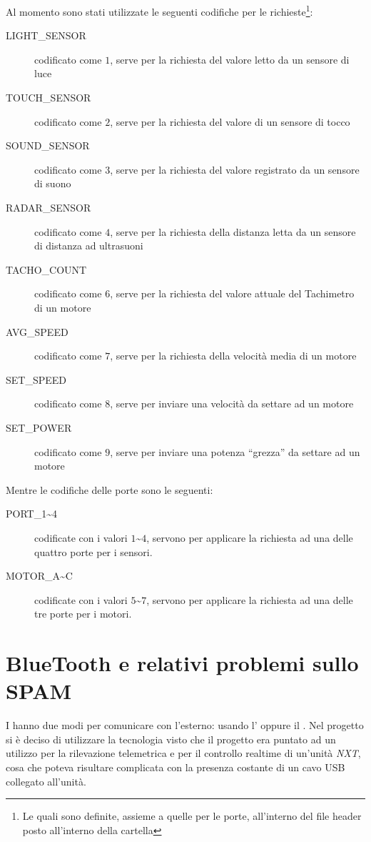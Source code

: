 Al momento sono stati utilizzate le seguenti codifiche per le
richieste\footnote{Le quali sono definite, assieme a quelle per le porte,
all'interno del file header  posto all'interno della
cartella }:
\begin{description}
    \item[LIGHT\_SENSOR] codificato come $1$, serve per la richiesta del
        valore letto da un sensore di luce
    \item[TOUCH\_SENSOR] codificato come $2$, serve per la richiesta del
        valore di un sensore di tocco
    \item[SOUND\_SENSOR] codificato come $3$, serve per la richiesta del
        valore registrato da un sensore di suono
    \item[RADAR\_SENSOR] codificato come $4$, serve per la richiesta della
        distanza letta da un sensore di distanza ad ultrasuoni
    \item[TACHO\_COUNT] codificato come $6$, serve per la richiesta del
        valore attuale del Tachimetro di un motore
    \item[AVG\_SPEED] codificato come $7$, serve per la richiesta della
        velocità media di un motore
    \item[SET\_SPEED] codificato come $8$, serve per inviare una velocità da
        settare ad un motore
    \item[SET\_POWER] codificato come $9$, serve per inviare una potenza
        ``grezza'' da settare ad un motore
\end{description}

Mentre le codifiche delle porte sono le seguenti:
\begin{description}
    \item[PORT\_1\textasciitilde{}4] codificate con i valori
        $1$\textasciitilde{}$4$, servono per applicare la richiesta ad una
        delle quattro porte per i sensori.
    \item[MOTOR\_A\textasciitilde{}C] codificate con i valori
        $5$\textasciitilde{}$7$, servono per applicare la richiesta ad una
        delle tre porte per i motori.
\end{description}

\section{BlueTooth e relativi problemi sullo SPAM}
I \nxt{} hanno due modi per comunicare con l'esterno: usando
l' oppure il . Nel progetto \BROFist{} si
è deciso di utilizzare la tecnologia  visto che il
progetto era puntato ad un utilizzo per la rilevazione telemetrica e per il
controllo realtime di un'unità \emph{NXT}, cosa che poteva risultare
complicata con la presenza costante di un cavo USB collegato all'unità.

